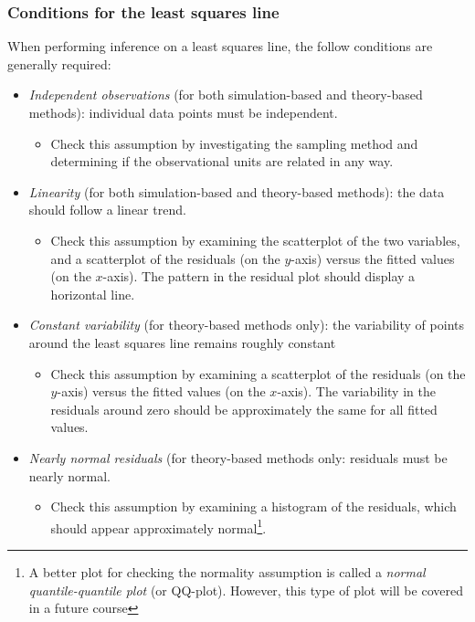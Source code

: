 \documentclass[
]{report}
\providecommand{\tightlist}{%
  \setlength{\itemsep}{0pt}\setlength{\parskip}{0pt}}
\begin{document}
\vspace{2in}

\hypertarget{conditions-for-the-least-squares-line}{%
\subsubsection*{Conditions for the least squares line}\label{conditions-for-the-least-squares-line}}

When performing inference on a least squares line, the follow conditions are generally required:

\begin{itemize}
\tightlist
\item
  \emph{Independent observations} (for both simulation-based and theory-based methods): individual data points must be independent.

  \begin{itemize}
  \tightlist
  \item
    Check this assumption by investigating the sampling method and determining if the observational units are related in any way.
  \end{itemize}
\item
  \emph{Linearity} (for both simulation-based and theory-based methods): the data should follow a linear trend.

  \begin{itemize}
  \tightlist
  \item
    Check this assumption by examining the scatterplot of the two variables, and a scatterplot of the residuals (on the \(y\)-axis) versus the fitted values (on the \(x\)-axis). The pattern in the residual plot should display a horizontal line.
  \end{itemize}
\item
  \emph{Constant variability} (for theory-based methods only): the variability of points around the least squares line remains roughly constant

  \begin{itemize}
  \tightlist
  \item
    Check this assumption by examining a scatterplot of the residuals (on the \(y\)-axis) versus the fitted values (on the \(x\)-axis). The variability in the residuals around zero should be approximately the same for all fitted values.
  \end{itemize}
\item
  \emph{Nearly normal residuals} (for theory-based methods only: residuals must be nearly normal.

  \begin{itemize}
  \tightlist
  \item
    Check this assumption by examining a histogram of the residuals, which should appear approximately normal\footnote{A better plot for checking the normality assumption is called a \emph{normal quantile-quantile plot} (or QQ-plot). However, this type of plot will be covered in a future course}.
  \end{itemize}
\end{itemize}
\end{document}
